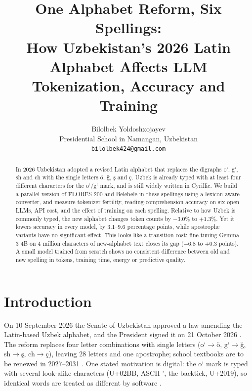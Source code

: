 \providecommand{\convuse}{YangiAlifbo\footnote{\url{https://github.com/BilolbekYoldoshxojayev/yangicha-alifbo}, commit \texttt{fdaafae}.}, an open-source converter}
\providecommand{\convbuilt}{the YangiAlifbo converter}
\title{One Alphabet Reform, Six Spellings:\\
How Uzbekistan's 2026 Latin Alphabet Affects LLM Tokenization, Accuracy and Training}

\author{Bilolbek Yoldoshxojayev \\
  Presidential School in Namangan, Uzbekistan \\
  \texttt{bilolbek424@gmail.com}}

\maketitle

\begin{abstract}
In 2026 Uzbekistan adopted a revised Latin alphabet that replaces the digraphs o\textquoteleft, g\textquoteleft, sh and ch with the single letters \"o, \u{g}, \c{s} and \c{c}. Uzbek is already typed with at least four different characters for the o\textquoteleft/g\textquoteleft{} mark, and is still widely written in Cyrillic. We build a parallel version of FLORES-200 and Belebele in these spellings using a lexicon-aware converter, and measure tokenizer fertility, reading-comprehension accuracy on six open LLMs, API cost, and the effect of training on each spelling. Relative to how Uzbek is commonly typed, the new alphabet changes token counts by $-3.0\%$ to $+1.3\%$. Yet it lowers accuracy in every model, by 3.1--9.6 percentage points, while apostrophe variants have no significant effect. This looks like a transition cost: fine-tuning Gemma 3 4B on 4 million characters of new-alphabet text closes its gap ($-6.8$ to $+0.3$ points). A small model trained from scratch shows no consistent difference between old and new spelling in tokens, training time, energy or predictive quality.
\end{abstract}

\section{Introduction}
On 10 September 2026 the Senate of Uzbekistan approved a law amending the Latin-based Uzbek alphabet, and the President signed it on 21 October 2026 \citep{legalalliance2026, gazeta2026}. The reform replaces four letter combinations with single letters (o\textquoteleft$\to$\"o, g\textquoteleft$\to$\u{g}, sh$\to$\c{s}, ch$\to$\c{c}), leaving 28 letters and one apostrophe; school textbooks are to be renewed in 2027--2031 \citep{legalalliance2026}. One stated motivation is digital: the o\textquoteleft{} mark is typed with several look-alike characters (U+02BB, ASCII ', the backtick, U+2019), so identical words are treated as different by software \citep{legalalliance2026}.

